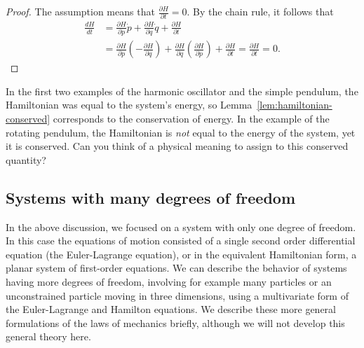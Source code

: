 \documentclass[12pt]{amsart}
\newcommand{\eqst}[1]{\begin{align*}#1\end{align*}}
\newcommand{\der}[2]{\frac{d#1}{d#2}}
\newcommand{\pder}[2]{\frac{\partial#1}{\partial#2}}
\newcounter{example}
\begin{document}
\begin{proof} The assumption means that $\pder{H}{t} = 0$. By the chain rule, it follows that
\eqst{
\der{H}{t} &= \pder{H}{p} \dot{p}+\pder{H}{q} \dot{q} + \pder{H}{t}
\\ &= \pder{H}{p}\left(-\pder{H}{q}\right)+\pder{H}{q}\left(\pder{H}{p}\right)+\pder{H}{t}
= \pder{H}{t} = 0.
}
\end{proof}

In the first two examples of the harmonic oscillator and the simple pendulum, the Hamiltonian was equal to the system's energy, so Lemma~\ref{lem:hamiltonian-conserved} corresponds to the conservation of energy. In the example of the rotating pendulum, the Hamiltonian is \emph{not} equal to the energy of the system, yet it is conserved. Can you think of a physical meaning to assign to this conserved quantity?

\subsection{Systems with many degrees of freedom}

In the above discussion, we focused on a system with only one degree of freedom. In this case the equations of motion consisted of a single second order differential equation (the Euler-Lagrange equation), or in the equivalent Hamiltonian form, a planar system of first-order equations. We can describe the behavior of systems having more degrees of freedom, involving for example many particles or an unconstrained particle moving in three dimensions, using a multivariate form of the Euler-Lagrange and Hamilton equations. We describe these more general formulations of the laws of mechanics briefly, although we will not develop this general theory here.
\end{document}
